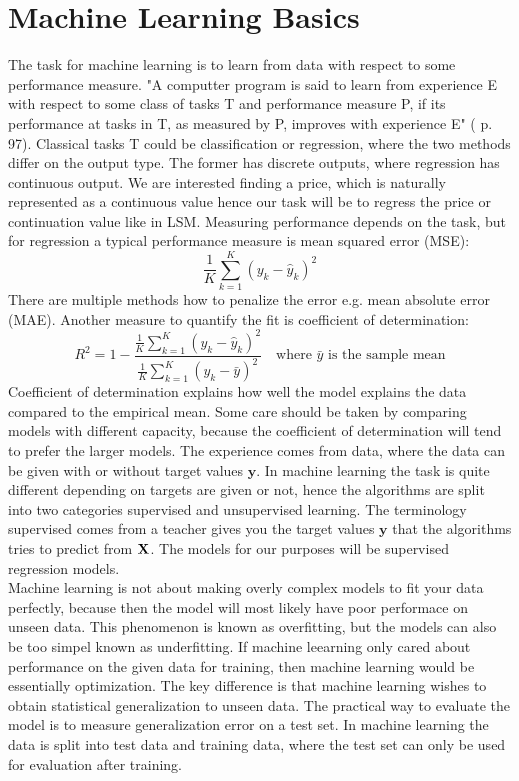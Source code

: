 \section{Machine Learning Basics}
The task for machine learning is to learn from data with respect to some performance measure. "A computter program is said to learn from experience E with respect to some class of tasks T and performance measure P, if its performance at tasks in T, as measured by P, improves with experience E" (\parencite{Goodfellow-et-al-2016} p. 97). Classical tasks T could be classification or regression, where the two methods differ on the output type. The former has discrete outputs, where regression has continuous output. We are interested finding a price, which is naturally represented as a continuous value hence our task will be to regress the price or continuation value like in LSM. Measuring performance depends on the task, but for regression a typical performance measure is mean squared error (MSE):
$$\frac{1}{K}\sum_{k=1}^{K} (y_k-\hat{y}_k)^2$$
There are multiple methods how to penalize the error e.g. mean absolute error (MAE). Another measure to quantify the fit is coefficient of determination:\\
$$R^2=1-\frac{\frac{1}{K}\sum_{k=1}^{K} (y_k-\hat{y}_k)^2}{\frac{1}{K}\sum_{k=1}^{K} (y_k-\bar{y})^2} \quad \text{where $\bar{y}$ is the sample mean}$$
Coefficient of determination explains how well the model explains the data compared to the empirical mean. Some care should be taken by comparing models with different capacity, because the coefficient of determination will tend to prefer the larger models. The experience comes from data, where the data can be given with or without target values $\bm{y}$. In machine learning the task is quite different depending on targets are given or not, hence the algorithms are split into two categories supervised and unsupervised learning. The terminology supervised comes from a teacher gives you the target values $\bm{y}$ that the algorithms tries to predict from $\mathbf{X}$. The models for our purposes will be supervised regression models.\\

Machine learning is not about making overly complex models to fit your data perfectly, because then the model will most likely have poor performace on unseen data. This phenomenon is known as overfitting, but the models can also be too simpel known as underfitting. If machine leearning only cared about performance on the given data for training, then machine learning would be essentially optimization. The key difference is that machine learning wishes to obtain statistical generalization to unseen data. The practical way to evaluate the model is to measure generalization error on a test set. In machine learning the data is split into test data and training data, where the test set can only be used for evaluation after training. \\

